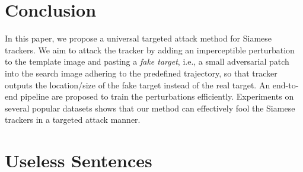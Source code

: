 \documentclass{article}
\begin{document}

\begin{table}[ht]
\centering
{}
\caption{Transferability of different architecture on OTB2015}
\end{table}

\section{Conclusion}

In this paper, we propose a universal targeted attack method for Siamese trackers. 
We aim to attack the tracker by adding an imperceptible perturbation to the template image and pasting a \textit{fake target}, i.e., a small adversarial patch into the search image adhering to the predefined trajectory, so that tracker outputs the location/size of the fake target instead of the real target. An end-to-end pipeline are proposed to train the perturbations efficiently.
Experiments on several popular datasets shows that our method can effectively fool the Siamese trackers in a targeted attack manner.

\clearpage



\section{Useless Sentences}
\end{document}
